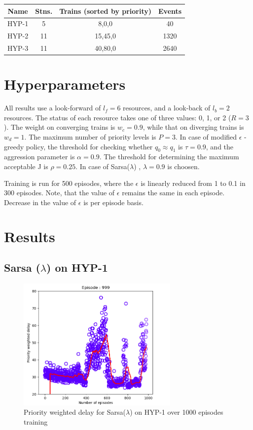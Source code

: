 \begin{center}
    \begin{tabular}{ |c|c|c|c| } 
     \hline
     Name & Stns. & Trains (sorted by priority) & Events \\ 
     \hline
     HYP-1 & 5 & 8,0,0 & 40 \\
     \hline
     HYP-2 & 11 & 15,45,0 & 1320 \\
     \hline
     HYP-3 & 11 & 40,80,0 & 2640 \\ 
     \hline
    \end{tabular}
\end{center}

\section{Hyperparameters}
All results use a look-forward of $l_f = 6$ resources, and a
look-back of $l_b = 2$ resources. The status of each resource
takes one of three values: 0, 1, or 2 ($R = 3$). The weight on
converging trains is $w_c = 0.9$, while that on diverging trains
is $w_d = 1$. The maximum number of priority levels is $P = 3$.
In case of modified $\epsilon$ - greedy policy, the threshold for checking whether $q_0 \approx q_1$ 
is $\tau = 0.9$, and the aggression parameter is $\alpha = 0.9$. The
threshold for determining the maximum acceptable J is
$\rho = 0.25$. In case of Sarsa($\lambda$) , $\lambda = 0.9$ is choosen.

\vspace{\baselineskip}
Training is run for 500 episodes, where the $\epsilon$ is linearly reduced from 1 to 0.1 in 300 
episodes. Note, that the value of $\epsilon$ remains the same in each episode. Decrease in the value of 
$\epsilon$ is per episode basis.

\section {Results}
\subsection{Sarsa ($\lambda$) on HYP-1}

\begin{figure}[h]
    \centering
    \includegraphics[width=0.7\textwidth]{Sarsa_HYP-1}
    \caption{ Priority weighted delay for Sarsa($\lambda$) on HYP-1 over 1000 episodes training}
    \label{image-myimage20}
\end{figure}

